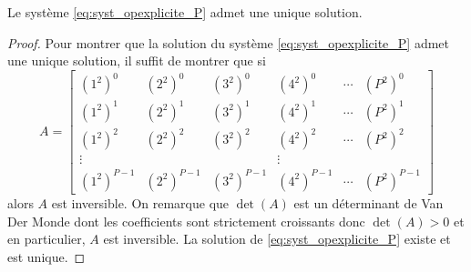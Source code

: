 \begin{proposition}
Le système \eqref{eq:syst_opexplicite_P} admet une unique solution.
\end{proposition}

\begin{proof}
Pour montrer que la solution du système \eqref{eq:syst_opexplicite_P} admet une unique solution, il suffit de montrer que si 
\begin{equation}
A = \begin{bmatrix}
(1^2)^0 & (2^2)^0 & (3^2)^0 & (4^2)^0 & \cdots & (P^2)^0\\
(1^2)^1 & (2^2)^1 & (3^2)^1 & (4^2)^1 & \cdots & (P^2)^1\\
(1^2)^2 & (2^2)^2 & (3^2)^2 & (4^2)^2 & \cdots & (P^2)^2\\
\vdots  &         &         & \vdots  &        &        \\
(1^2)^{P-1} & (2^2)^{P-1} & (3^2)^{P-1} & (4^2)^{P-1} & \cdots & (P^2)^{P-1}
\end{bmatrix} 
\end{equation}
alors $A$ est inversible.
On remarque que $\det (A)$ est un déterminant de Van Der Monde dont les coefficients sont strictement croissants donc $\det(A) > 0$ et en particulier, $A$ est inversible. La solution de \eqref{eq:syst_opexplicite_P} existe et est unique.
\end{proof}



























